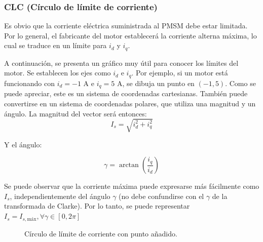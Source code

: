 \subsubsection{CLC (Círculo de límite de corriente)}

Es obvio que la corriente eléctrica suministrada al PMSM debe estar limitada. Por lo general, el fabricante del motor establecerá la corriente alterna máxima, lo cual se traduce en un límite para \(i_d\) y \(i_q\).

A continuación, se presenta un gráfico muy útil para conocer los límites del motor. Se establecen los ejes como $i_d$ e $i_q$. Por ejemplo, si un motor está funcionando con $i_d = -1 \text{ A}$ e $i_q = 5 \text{ A}$, se dibuja un punto en $(-1,5)$. Como se puede apreciar, este es un sistema de coordenadas cartesianas. También puede convertirse en un sistema de coordenadas polares, que utiliza una magnitud y un ángulo. La magnitud del vector será entonces:
\begin{equation}
I_{s} = \sqrt{i_d^2+i_q^2}
\end{equation}

Y el ángulo:

\begin{equation}
\gamma = \arctan\left(\frac{i_q}{i_d}\right)
\end{equation}

Se puede observar que la corriente máxima puede expresarse más fácilmente como $I_s$, independientemente del ángulo $\gamma$ (no debe confundirse con el $\gamma$ de la transformada de Clarke). Por lo tanto, se puede representar $I_s = I_{s,\text{máx}} , \forall \gamma \in [0,2\pi]$

\begin{figure}[H]
	\centering
	\caption{Círculo de límite de corriente con punto añadido.}
\end{figure}



